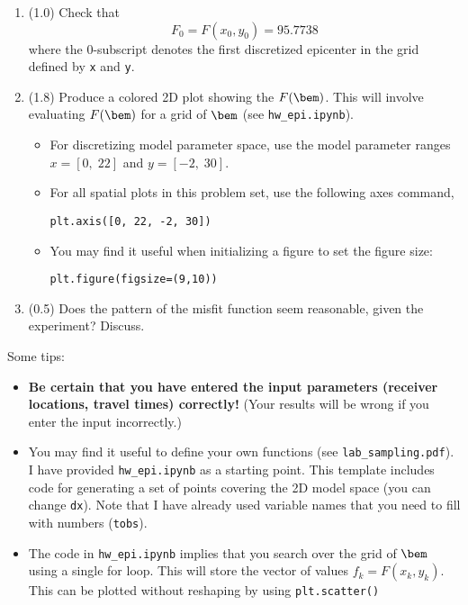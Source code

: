 \documentclass[11pt,titlepage,fleqn]{article}
\begin{document}
\begin{enumerate}
\begin{enumerate}
\item (1.0) Check that
%
\begin{equation*}
F_0 = F(x_0,y_0) = 95.7738
\end{equation*}
%
where the 0-subscript denotes the first discretized epicenter in the grid defined by \verb+x+ and \verb+y+.

\item (1.8) Produce a colored 2D plot showing the $F(\bem)$. This will involve evaluating $F(\bem)$ for a grid of $\bem$ (see \verb+hw_epi.ipynb+).

\begin{itemize}
\item For discretizing model parameter space, use the model parameter ranges $x = [0,\;22]$ and $y = [-2,\;30]$.
\item For all spatial plots in this problem set, use the following axes command,

\verb+plt.axis([0, 22, -2, 30])+

\item You may find it useful when initializing a figure to set the figure size:

\verb+plt.figure(figsize=(9,10))+
\end{itemize}

\item (0.5) Does the pattern of the misfit function seem reasonable, given the experiment? Discuss.
\end{enumerate}

Some tips:
%
\begin{itemize}
\item {\bf Be certain that you have entered the input parameters (\eg receiver locations, travel times) correctly!} (Your results will be wrong if you enter the input incorrectly.)

\item You may find it useful to define your own functions (see \verb+lab_sampling.pdf+). I have provided \verb+hw_epi.ipynb+ as a starting point. This template includes code for generating a set of points covering the 2D model space (you can change \verb+dx+). Note that I have already used variable names that you need to fill with numbers (\eg \verb+tobs+).

\item The code in \verb+hw_epi.ipynb+ implies that you search over the grid of $\bem$ using a single for loop. This will store the vector of values $f_k = F(x_k,y_k)$. This can be plotted without reshaping by using \verb+plt.scatter()+


\end{itemize}
\end{enumerate}
\end{document}
